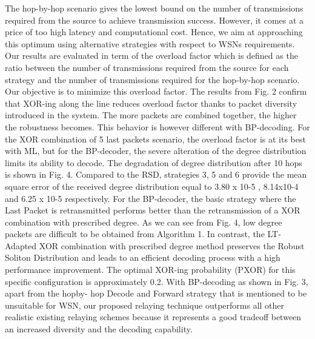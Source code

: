 The hop-by-hop scenario gives the lowest bound on the
number of transmissions required from the source to achieve
transmission success. However, it comes at a price of too high
latency and computational cost. Hence, we aim at approaching
this optimum using alternative strategies with respect to WSNs
requirements. Our results are evaluated in term of the overload
factor which is defined as the ratio between the number
of transmissions required from the source for each strategy
and the number of transmissions required for the hop-by-hop
scenario. Our objective is to minimize this overload factor.
The results from Fig. 2 confirm that XOR-ing along the line
reduces overload factor thanks to packet diversity introduced
in the system. The more packets are combined together, the
higher the robustness becomes. This behavior is however
different with BP-decoding. For the XOR combination of 5 last
packets scenario, the overload factor is at its best with ML,
but for the BP-decoder, the severe alteration of the degree
distribution limits its ability to decode. The degradation of
degree distribution after 10 hops is shown in Fig. 4. Compared
to the RSD, strategies 3, 5 and 6 provide the mean square
error of the received degree distribution equal to 3.80 x 10-5 ,
8.14x10-4 and 6.25 x 10-5 respectively.
For the BP-decoder, the basic strategy where the Last Packet
is retransmitted performs better than the retransmission of a
XOR combination with prescribed degree. As we can see from
Fig. 4, low degree packets are difficult to be obtained from
Algorithm 1. In contrast, the LT-Adapted XOR combination
with prescribed degree method preserves the Robust Soliton
Distribution and leads to an efficient decoding process with a
high performance improvement. The optimal XOR-ing probability
(PXOR) for this specific configuration is approximately
0.2. With BP-decoding as shown in Fig. 3, apart from the hopby-
hop Decode and Forward strategy that is mentioned to be
unsuitable for WSN, our proposed relaying technique outperforms
all other realistic existing relaying schemes because it
represents a good tradeoff between an increased diversity and
the decoding capability.

